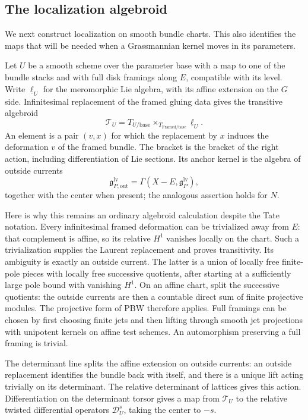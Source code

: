 \documentclass[11pt]{article}
\numberwithin{equation}{section}
\theoremstyle{definition}
\theoremstyle{remark}
\begin{document}
\subsection{The localization algebroid}

We next construct localization on smooth bundle charts.  This also
identifies the maps that will be needed when a Grassmannian kernel
moves in its parameters.

Let $U$ be a smooth scheme over the parameter base with a map to one
of the bundle stacks and with full disk framings along $E$, compatible
with its level.  Write $\underline\ell_U$ for the meromorphic Lie
algebra, with its affine extension on the $G$ side.  Infinitesimal
replacement of the framed gluing data gives the transitive algebroid
\[
 \mathcal T_U
   =T_{U/\mathrm{base}}
       \mathop{\times}_{T_{\mathrm{Framed}/\mathrm{base}}}
                   \underline\ell_U.
\]
An element is a pair $(v,x)$ for which the replacement by $x$ induces
the deformation $v$ of the framed bundle.  The bracket is the bracket
of the right action, including differentiation of Lie sections.
Its anchor kernel is the algebra of outside currents
\[
 \mathfrak g^{\mathrm{lv}}_{P,\mathrm{out}}
       =\Gamma(X-E,\mathfrak g^{\mathrm{lv}}_P),
\]
together with the center when present; the analogous assertion holds
for $N$.

Here is why this remains an ordinary algebroid calculation despite the
Tate notation.  Every infinitesimal framed deformation can be
trivialized away from $E$: that complement is affine, so its relative
$H^1$ vanishes locally on the chart.  Such a trivialization supplies
the Laurent replacement and proves transitivity.  Its ambiguity is
exactly an outside current.  The latter is a union of locally free
finite-pole pieces with locally free successive quotients, after
starting at a sufficiently large pole bound with vanishing $H^1$.
On an affine chart, split the successive quotients: the outside
currents are then a countable direct sum of finite projective modules.
The projective form of PBW therefore applies.  Full framings can be chosen by first choosing finite jets and then lifting
through smooth jet projections with unipotent kernels on affine test
schemes.  An automorphism preserving a full framing is trivial.

The determinant line splits the affine extension on outside currents:
an outside replacement identifies the bundle back with itself, and
there is a unique lift acting trivially on its determinant.  The
relative determinant of lattices gives this action.  Differentiation
on the determinant torsor gives a map from $\mathcal T_U$ to the
relative twisted differential operators $\mathscr D_U^s$, taking the
center to $-s$.
\end{document}
